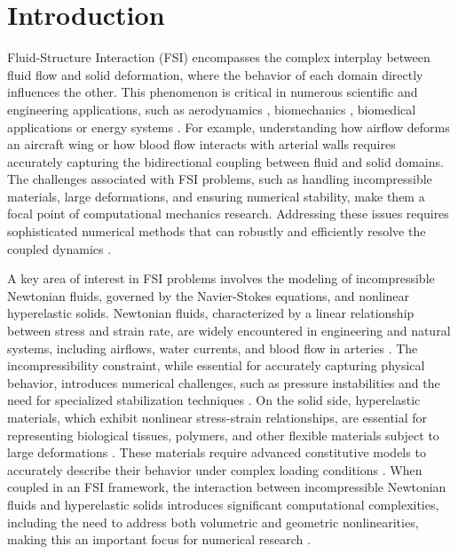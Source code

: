 \documentclass[11pt,english]{article}
\begin{document}
\maketitle
{}

%
%
\section{Introduction} 
Fluid-Structure Interaction (FSI) encompasses the complex interplay between fluid flow and solid deformation, where the behavior of each domain directly influences the other. This phenomenon is critical in numerous scientific and engineering applications, such as aerodynamics \cite{FSIaeroelastic}, biomechanics \cite{FSIBiomechanics}, biomedical applications \cite{FSIBiomedical} or energy systems \cite{FSIEnergy}. For example, understanding how airflow deforms an aircraft wing or how blood flow interacts with arterial walls requires accurately capturing the bidirectional coupling between fluid and solid domains. The challenges associated with FSI problems, such as handling incompressible materials, large deformations, and ensuring numerical stability, make them a focal point of computational mechanics research. Addressing these issues requires sophisticated numerical methods that can robustly and efficiently resolve the coupled dynamics \cite{NumMethFSI}.

A key area of interest in FSI problems involves the modeling of incompressible Newtonian fluids, governed by the Navier-Stokes equations, and nonlinear hyperelastic solids. Newtonian fluids, characterized by a linear relationship between stress and strain rate, are widely encountered in engineering and natural systems, including airflows, water currents, and blood flow in arteries \cite{NewtonianFluids}. The incompressibility constraint, while essential for accurately capturing physical behavior, introduces numerical challenges, such as pressure instabilities and the need for specialized stabilization techniques \cite{Codina2000,Codina2001}. On the solid side, hyperelastic materials, which exhibit nonlinear stress-strain relationships, are essential for representing biological tissues, polymers, and other flexible materials subject to large deformations \cite{Bonet,Holzapfel2001}. These materials require advanced constitutive models to accurately describe their behavior under complex loading conditions \cite{Comelles2016}. When coupled in an FSI framework, the interaction between incompressible Newtonian fluids and hyperelastic solids introduces significant computational complexities, including the need to address both volumetric and geometric nonlinearities, making this an important focus for numerical research \cite{FSIOnate}.
\end{document}
